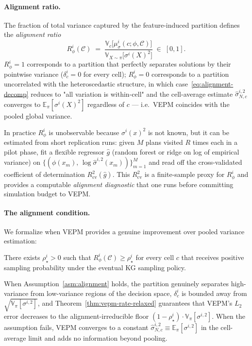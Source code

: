 \paragraph{Alignment ratio.}
The fraction of total variance captured by the feature-induced partition
defines the \emph{alignment ratio}
\begin{equation}\label{eq:alignment-ratio}
  R_\phi^{i}(\mathcal{C})
    \;=\;
    \frac{\mathbb{V}_{c}\!\bigl[\mu_\sigma^{i}(c;\phi,\mathcal{C})\bigr]}
         {\mathbb{V}_{X\sim\pi}\!\bigl[\sigma^{i}(X)^{2}\bigr]}
    \;\in\;[0,1].
\end{equation}
$R_\phi^{i}=1$ corresponds to a partition that perfectly separates
solutions by their pointwise variance ($\delta_c^i=0$ for every cell);
$R_\phi^{i}=0$ corresponds to a partition uncorrelated with the
heteroscedastic structure, in which case~\eqref{eq:alignment-decomp}
reduces to "all variation is within-cell" and the cell-average estimate
$\hat\sigma^{i,2}_{N,c}$ converges to $\mathbb{E}_\pi[\sigma^{i}(X)^{2}]$
regardless of $c$ — i.e.\ VEPM coincides with the pooled global variance.

In practice $R_\phi^{i}$ is unobservable because $\sigma^{i}(x)^2$ is not
known, but it can be estimated from short replication runs:  given $M$
plans visited $R$ times each in a pilot phase, fit a flexible regressor
$\hat g$ (random forest or ridge on log of empirical variance) on
$\{(\phi(x_m),\, \log\hat\sigma^{i,2}(x_m))\}_{m=1}^M$ and read off the
cross-validated coefficient of determination
$R^{2}_{\mathrm{cv}}(\hat g)$.  This $R^{2}_{\mathrm{cv}}$ is a finite-sample
proxy for $R_\phi^{i}$ and provides a computable \emph{alignment
diagnostic} that one runs before committing simulation budget to VEPM.

\paragraph{The alignment condition.}
We formalize when VEPM provides a genuine improvement over pooled
variance estimation:

\begin{assumption}[Alignment]\label{asm:alignment}
  There exists $\rho^{i}_\star > 0$ such that
  $R_\phi^{i}(\mathcal{C}) \ge \rho^{i}_\star$ for every cell $c$ that
  receives positive sampling probability under the eventual KG sampling
  policy.
\end{assumption}

When Assumption~\ref{asm:alignment} holds, the partition genuinely
separates high-variance from low-variance regions of the decision space,
$\delta_c^i$ is bounded away from $\sqrt{\mathbb{V}_\pi[\sigma^{i,2}]}$,
and Theorem~\ref{thm:vepm-rate-relaxed} guarantees that VEPM's
$L_2$ error decreases to the alignment-irreducible floor
$(1-\rho^{i}_\star)\cdot\mathbb{V}_\pi[\sigma^{i,2}]$.  When the
assumption fails, VEPM converges to a constant $\hat\sigma^{i,2}_{N,c}
\equiv \mathbb{E}_\pi[\sigma^{i,2}]$ in the cell-average limit and
adds no information beyond pooling.


